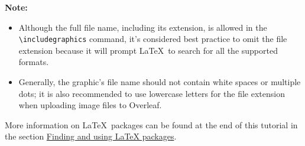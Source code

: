 \textbf{Note:}

\begin{itemize}
    \item Although the full file name, including its extension, is allowed in the \\\verb|\includegraphics| command, it’s considered best practice to omit the file extension because it will prompt \LaTeX\ to search for all the supported formats.
    \item Generally, the graphic’s file name should not contain white spaces or multiple dots; it is also recommended to use lowercase letters for the file extension when uploading image files to Overleaf.
\end{itemize}

More information on \LaTeX\ packages can be found at the end of this tutorial in the section \href{https://www.overleaf.com/learn/latex/Learn_LaTeX_in_30_minutes#Finding_and_using_LaTeX_packages}{Finding and using LaTeX packages}.